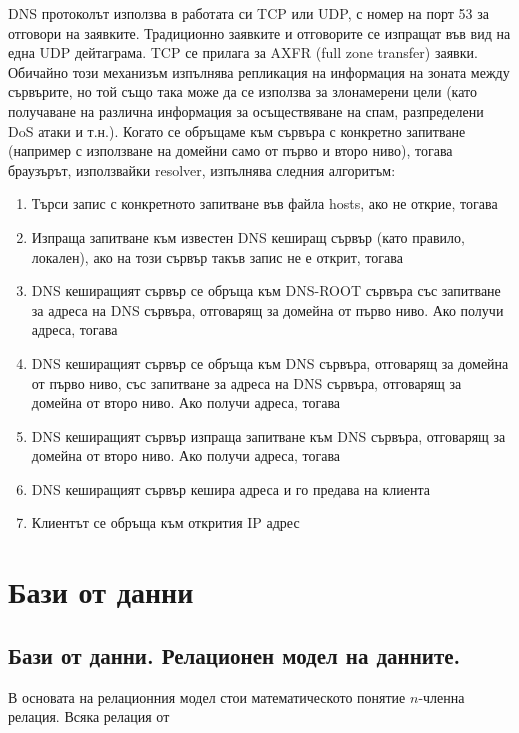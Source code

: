 \documentclass{article}
\begin{document}
DNS протоколът използва в работата си TCP или UDP, с номер на порт 53 за отговори на заявките. Традиционно заявките и отговорите
се изпращат във вид на една UDP дейтаграма. TCP се прилага за AXFR (full zone transfer) заявки. Обичайно този механизъм изпълнява
репликация на информация на зоната между сървърите, но той също така може да се използва за злонамерени цели (като получаване на
различна информация за осъществяване на спам, разпределени DoS атаки и т.н.). Когато се обръщаме към сървъра с конкретно
запитване (например с използване на домейни само от първо и второ ниво), тогава браузърът, използвайки resolver, изпълнява
следния алгоритъм:
\begin{enumerate}
    \item Търси запис с конкретното запитване във файла hosts, ако не открие, тогава
    \item  Изпраща запитване към известен DNS кеширащ сървър (като правило, локален), ако на този сървър такъв запис не е
    открит, тогава
    \item DNS кеширащият сървър се обръща към DNS-ROOT сървъра със запитване за адреса на DNS сървъра, отговарящ за домейна от
    първо ниво. Ако получи адреса, тогава
    \item DNS кеширащият сървър се обръща към DNS сървъра, отговарящ за домейна от първо ниво, със запитване за адреса на DNS
    сървъра, отговарящ за домейна от второ ниво. Ако получи адреса, тогава
    \item DNS кеширащият сървър изпраща запитване към DNS сървъра, отговарящ за домейна от второ ниво. Ако получи адреса, тогава
    \item DNS кеширащият сървър кешира адреса и го предава на клиента
    \item Клиентът се обръща към открития IP адрес
\end{enumerate}

\section*{Бази от данни}

\subsection*{Бази от данни. Релационен модел на данните.}

В основата на релационния модел стои математическото понятие $n$-членна релация. Всяка релация от 
\end{document}
